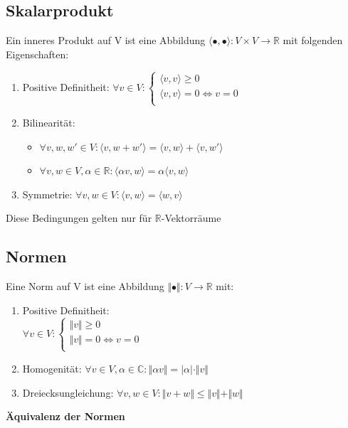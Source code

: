\documentclass[8pt, a4paper, landscape, fleqn]{scrartcl}
\def\C{\mathbb{C}}
\begin{document}
\begin{multicols*}{3}
			\subsection{Skalarprodukt}
					Ein inneres Produkt auf V ist eine Abbildung $\langle\bullet,\bullet\rangle: V\times V\rightarrow\mathbb{R}$ mit folgenden Eigenschaften:
					\begin{enumerate}
						\item Positive Definitheit: $\forall v\in V: \begin{cases}
						\langle v,v\rangle\ge0 \\
						\langle v,v\rangle=0\Leftrightarrow v=0\\
						\end{cases} $\\
						\item Bilinearität: 
						\begin{itemize}
							\item $\forall v,w,w'\in V:\langle v,w+w'\rangle=\langle v,w\rangle+\langle v,w'\rangle$
							\item $\forall v,w\in V, \alpha\in\mathbb{R}:\langle \alpha v,w\rangle=\alpha\langle v,w\rangle$
						\end{itemize}
						\item Symmetrie: $\forall v,w\in V:\langle v,w\rangle=\langle w,v\rangle$
					\end{enumerate}
					Diese Bedingungen gelten nur für $\mathbb{R}$-Vektorräume
					
		    \subsection{Normen}
					Eine Norm auf V ist eine Abbildung $\Vert\bullet\Vert:V\rightarrow\mathbb{R}$ mit:
					\begin{enumerate}
						\item Positive Definitheit:\\
						$\forall v\in V:\begin{cases}
						\Vert v\Vert\ge0 \\
						\Vert v\Vert=0\Leftrightarrow v=0\\
						\end{cases} $	
						\item Homogenität: $\forall v\in V,\alpha\in\C:\Vert\alpha v\Vert=\vert\alpha\vert\cdot\Vert v\Vert$
						\item Dreiecksungleichung: $\forall v,w\in V:\Vert v+w\Vert\le\Vert v\Vert+\Vert w\Vert$				
					\end{enumerate}
					\textbf{Äquivalenz der Normen}
					

\end{multicols*}
\end{document}
